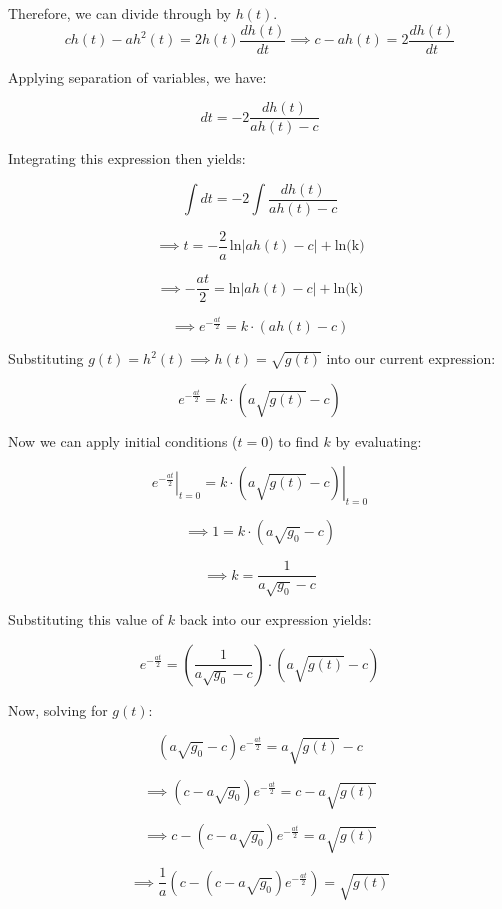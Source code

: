 \documentclass[]{article}
\begin{document}

Therefore, we can divide through by $h(t)$.
\[
c h(t) -ah^2(t) = 2h(t)\frac{dh(t)}{dt} \implies c - ah(t) = 2\frac{dh(t)}{dt}
\]

Applying separation of variables, we have:

\[
dt = -2 \frac{dh(t)}{ah(t)-c}
\]

Integrating this expression then yields:

\[
\int{dt} = -2\int{\frac{dh(t)}{ah(t)-c}}
\]

\[
\implies t = -\frac{2}{a} \, \text{ln}\left|ah(t)-c\right| + \text{ln(k)}
\]

\[
\implies -\frac{at}{2} = \text{ln}\left|ah(t)-c\right| + \text{ln(k)}
\]

\[
\implies e^{-\frac{at}{2}} = k\cdot (ah(t)-c)
\]

Substituting $g(t) = h^2(t)\implies h(t) = \sqrt{g(t)}$ into our current expression:

\[
e^{-\frac{at}{2}} = k\cdot (a \sqrt{g(t)}-c)
\]

Now we can apply initial conditions ($t=0$) to find $k$ by evaluating:

\[
\left. e^{-\frac{at}{2}} \right|_{t=0} = \left.  k\cdot (a \sqrt{g(t)}-c) \right|_{t=0}
\]

\[
\implies 1 = k \cdot (a \sqrt{g_0}-c)
\]

\[
\implies k = \frac{1}{a \sqrt{g_0}-c}
\]

Substituting this value of $k$ back into our expression yields:

\[
e^{-\frac{at}{2}} = \left(\frac{1}{a \sqrt{g_0}-c}\right)\cdot (a \sqrt{g(t)}-c)
\]

Now, solving for $g(t)$:

\[
\left(a \sqrt{g_0}-c\right)e^{-\frac{at}{2}} = a \sqrt{g(t)}-c
\]

\[
\implies \left(c - a \sqrt{g_0}\right)e^{-\frac{at}{2}} = c - a \sqrt{g(t)}
\]

\[
\implies c - \left(c - a \sqrt{g_0}\right)e^{-\frac{at}{2}} = a \sqrt{g(t)}
\]

\[
\implies \frac{1}{a}\left(c - \left(c - a \sqrt{g_0}\right)e^{-\frac{at}{2}}\right) =  \sqrt{g(t)}
\]
\end{document}
